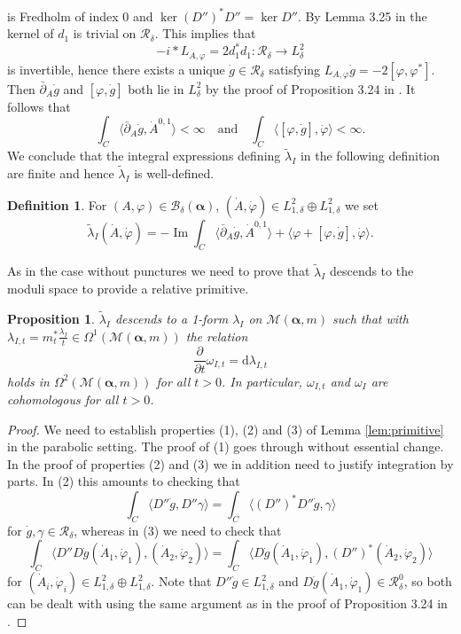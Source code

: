 \documentclass[12pt,letterpaper,reqno]{amsart}
\def\mathbf#1{#1}%
\newtheorem{prop}[thm]{Proposition}
\theoremstyle{remark}
\theoremstyle{definition}
\newtheorem{defn}[thm]{Definition}
\numberwithin{thm}{section}
\numberwithin{equation}{section}
\numberwithin{figure}{section}
\newcommand{\calB}{\mathcal B}
\newcommand{\de}{\mathrm{d}}
\newcommand{\bsa}{\boldsymbol{\alpha}}
\DeclareMathOperator{\im}{Im}
\begin{document}
is Fredholm of index $0$ and $\ker (D'')^*D'' = \ker D''$. By Lemma 3.25 in \cite{collier2024conformallimitsparabolicslnchiggs}  the kernel of $d_1$ is trivial on $\mathcal{R}_\delta$. This implies that 
\[
- i \ast L_{A,\varphi} = 2 d_1^* d_1 : \mathcal{R}_\delta \longrightarrow L^2_\delta
\]
is invertible, hence there exists a unique $\dot g \in \mathcal{R}_\delta$ satisfying $L_{A,\varphi}\dot g = -2 [\varphi,\varphi^*]$. Then $\bar\partial_A \dot g$ and $[\varphi, \dot g]$ both lie in $L^2_{\delta}$ by the proof of Proposition 3.24 in \cite{collier2024conformallimitsparabolicslnchiggs}. It follows that
\[
\int_C \langle \bar\partial_A \dot g, \dot A^{0,1} \rangle < \infty \quad \text{and} \quad \int_C \langle [\varphi, \dot g] , \dot \varphi \rangle < \infty.
\]
We conclude that the integral expressions defining $\tilde \lambda_I$ in the following definition are finite and hence $\tilde \lambda_I$ is well-defined.

\begin{defn}
	For $(A,\varphi) \in \calB_\delta(\bsa)$, $(\dot A, \dot \varphi) \in L^2_{1,\delta} \oplus L^2_{1,\delta}$ we set
	\[
	\tilde\lambda_I (\dot A, \dot \varphi) = - \im \int_C \langle \bar\partial_A \dot g, \dot A^{0,1} \rangle + \langle \varphi + [\varphi, \dot g] , \dot \varphi \rangle.
	\]
\end{defn}

As in the case without punctures we need to prove that $\tilde\lambda_I$ descends to the moduli space to provide a relative primitive. 
\begin{prop}\label{prop:dlambda}
$\tilde\lambda_I$ descends to a 1-form $\lambda_I$ on $\mathcal{M}(\boldsymbol{\alpha}, \mathbf{m})$ such that with  $\lambda_{I,t} = m_t^* \frac{\lambda_I}{t} \in \Omega^1(\mathcal{M}(\boldsymbol{\alpha}, \mathbf{m}))$ the relation
\[
\frac{\partial}{\partial t} \omega_{I,t}= \de \lambda_{I,t}
\]
holds in $\Omega^2(\mathcal{M}(\boldsymbol{\alpha}, \mathbf{m}))$ for all $t>0$. In particular, $\omega_{I,t}$ and $\omega_I$ are cohomologous for all $t>0$. 
\end{prop}

\begin{proof}
We need to establish properties (1), (2) and (3) of Lemma \ref{lem:primitive} in the parabolic setting. The proof of (1) goes through without essential change. In the proof of properties (2) and (3) we in addition need to justify integration by parts. In (2) this amounts to checking that 
\[
\int_C \langle D'' \dot g, D'' \gamma \rangle = \int_C \langle (D'')^* D'' \dot g, \gamma \rangle
\]
for $\dot g, \gamma \in \mathcal{R}_\delta$, whereas in (3) we need to check that
\[
\int_C \langle D'' D \dot g (\dot A_1, \dot \varphi_1), (\dot A_2, \dot \varphi_2) \rangle = \int_C \langle D \dot g (\dot A_1, \dot \varphi_1), (D'')^*(\dot A_2, \dot \varphi_2) \rangle 
\]
for $(\dot A_i, \dot \varphi_i) \in L^2_{1, \delta} \oplus L^2_{1, \delta}$. Note that $D'' \dot g \in L^2_{1, \delta}$ and $D \dot g (\dot A_1, \dot \varphi_1) \in \mathcal{R}^0_\delta$, so both can be dealt with using the same argument as in the proof of Proposition 3.24 in \cite{collier2024conformallimitsparabolicslnchiggs}.
\end{proof}
\end{document}
